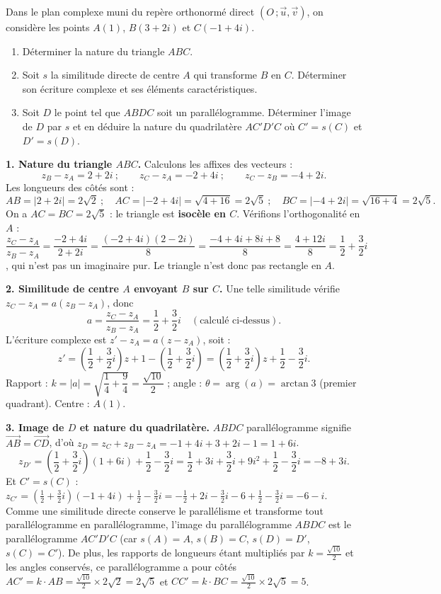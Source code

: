\documentclass[11pt]{article}
\begin{document}
\begin{exoresolu}
Dans le plan complexe muni du repère orthonormé direct $(O\,;\vec{u},\vec{v})$, on considère les points $A(1)$, $B(3 + 2i)$ et $C(-1 + 4i)$.
\begin{enumerate}
\item Déterminer la nature du triangle $ABC$.
\item Soit $s$ la similitude directe de centre $A$ qui transforme $B$ en $C$. Déterminer son écriture complexe et ses éléments caractéristiques.
\item Soit $D$ le point tel que $ABDC$ soit un parallélogramme. Déterminer l'image de $D$ par $s$ et en déduire la nature du quadrilatère $AC'D'C$ où $C' = s(C)$ et $D' = s(D)$.
\end{enumerate}
\tcblower
\textbf{1. Nature du triangle $ABC$.} Calculons les affixes des vecteurs :
\[ z_B - z_A = 2 + 2i \ ; \qquad z_C - z_A = -2 + 4i \ ; \qquad z_C - z_B = -4 + 2i. \]
Les longueurs des côtés sont :
\[ AB = |2 + 2i| = 2\sqrt{2} \ ; \quad AC = |-2 + 4i| = \sqrt{4 + 16} = 2\sqrt{5} \ ; \quad BC = |-4 + 2i| = \sqrt{16 + 4} = 2\sqrt{5}. \]
On a $AC = BC = 2\sqrt{5}$ : le triangle est \textbf{isocèle en $C$}.
Vérifions l'orthogonalité en $A$ : $\dfrac{z_C - z_A}{z_B - z_A} = \dfrac{-2+4i}{2+2i} = \dfrac{(-2+4i)(2-2i)}{8} = \dfrac{-4 + 4i + 8i + 8}{8} = \dfrac{4 + 12i}{8} = \dfrac{1}{2} + \dfrac{3}{2}i$, qui n'est pas un imaginaire pur. Le triangle n'est donc pas rectangle en $A$.

\textbf{2. Similitude de centre $A$ envoyant $B$ sur $C$.} Une telle similitude vérifie $z_C - z_A = a(z_B - z_A)$, donc
\[ a = \frac{z_C - z_A}{z_B - z_A} = \frac{1}{2} + \frac{3}{2}i \quad (\text{calculé ci-dessus}). \]
L'écriture complexe est $z' - z_A = a(z - z_A)$, soit :
\[ z' = \left(\frac{1}{2} + \frac{3}{2}i\right) z + 1 - \left(\frac{1}{2} + \frac{3}{2}i\right) = \left(\frac{1}{2} + \frac{3}{2}i\right) z + \frac{1}{2} - \frac{3}{2}i. \]
Rapport : $k = |a| = \sqrt{\dfrac{1}{4} + \dfrac{9}{4}} = \dfrac{\sqrt{10}}{2}$ ; angle : $\theta = \arg(a) = \arctan 3$ (premier quadrant). Centre : $A(1)$.

\textbf{3. Image de $D$ et nature du quadrilatère.} $ABDC$ parallélogramme signifie $\overrightarrow{AB} = \overrightarrow{CD}$, d'où $z_D = z_C + z_B - z_A = -1 + 4i + 3 + 2i - 1 = 1 + 6i$.
\[ z_{D'} = \left(\frac{1}{2} + \frac{3}{2}i\right)(1 + 6i) + \frac{1}{2} - \frac{3}{2}i = \frac{1}{2} + 3i + \frac{3}{2}i + 9i^2 + \frac{1}{2} - \frac{3}{2}i = -8 + 3i. \]
Et $C' = s(C)$ : $z_{C'} = \left(\frac{1}{2} + \frac{3}{2}i\right)(-1+4i) + \frac{1}{2} - \frac{3}{2}i = -\frac{1}{2} + 2i - \frac{3}{2}i - 6 + \frac{1}{2} - \frac{3}{2}i = -6 - i$.
Comme une similitude directe conserve le parallélisme et transforme tout parallélogramme en parallélogramme, l'image du parallélogramme $ABDC$ est le parallélogramme $A C' D' C$ (car $s(A) = A$, $s(B) = C$, $s(D) = D'$, $s(C) = C'$). De plus, les rapports de longueurs étant multipliés par $k = \frac{\sqrt{10}}{2}$ et les angles conservés, ce parallélogramme a pour côtés $AC' = k \cdot AB = \frac{\sqrt{10}}{2} \times 2\sqrt{2} = 2\sqrt{5}$ et $CC' = k \cdot BC = \frac{\sqrt{10}}{2} \times 2\sqrt{5} = 5$.


\end{exoresolu}
\end{document}
